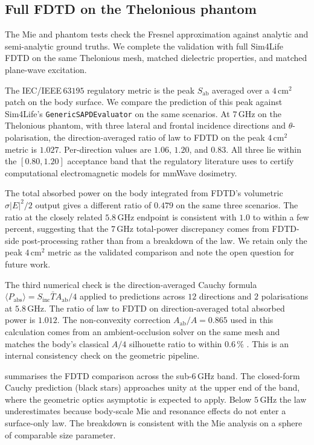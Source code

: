 \documentclass[journal,twocolumn,10pt]{IEEEtran}
\theoremstyle{plain}
\theoremstyle{remark}
\newcommand{\Sinc}{S_{\mathrm{inc}}}
\newcommand{\Sab}{S_{\mathrm{ab}}}
\newcommand{\Tbar}{\bar{T}}
\begin{document}
\subsection{Full FDTD on the Thelonious phantom}
The Mie and phantom tests check the Fresnel approximation against
analytic and semi-analytic ground truths. We complete the validation
with full Sim4Life FDTD on the same Thelonious mesh, matched
dielectric properties, and matched plane-wave excitation.

The IEC/IEEE\,$63195$ regulatory metric is the peak $\Sab$ averaged
over a $4\,\mathrm{cm}^2$ patch on the body surface. We compare the
prediction of this peak against Sim4Life's
\texttt{GenericSAPDEvaluator} on the same scenarios. At $7\,$GHz on
the Thelonious phantom, with three lateral and frontal incidence
directions and $\theta$-polarisation, the direction-averaged ratio
of law to FDTD on the peak $4\,\mathrm{cm}^2$ metric is
$1.027$. Per-direction values are $1.06$, $1.20$, and $0.83$. All
three lie within the $[0.80, 1.20]$ acceptance band that the
regulatory literature uses to certify computational electromagnetic
models for mmWave dosimetry.

The total absorbed power on the body integrated from FDTD's
volumetric $\sigma|E|^2/2$ output gives a different ratio of $0.479$
on the same three scenarios. The ratio at the closely related
$5.8\,$GHz endpoint is consistent with $1.0$ to within a few
percent, suggesting that the $7\,$GHz total-power discrepancy comes
from FDTD-side post-processing rather than from a breakdown of the
law. We retain only the peak $4\,\mathrm{cm}^2$
metric as the validated comparison and note the open question for
future work.

The third numerical check is the direction-averaged Cauchy formula
$\langle P_{\mathrm{abs}} \rangle = \Sinc \Tbar A_{\mathrm{ab}}/4$
applied to predictions across $12$ directions and $2$ polarisations
at $5.8\,$GHz. The ratio of law to FDTD on direction-averaged total
absorbed power is $1.012$. The
non-convexity correction $A_{\mathrm{ab}}/A = 0.865$ used in this
calculation comes from an ambient-occlusion solver on the same mesh
and matches the body's classical $A/4$ silhouette ratio to within
$0.6\,\%$ \cite{Cauchy1841}. This is an internal consistency check
on the geometric pipeline.

 summarises the FDTD comparison across the
sub-$6\,$GHz band. The closed-form Cauchy prediction (black stars)
approaches unity at the upper end of the band, where the geometric
optics asymptotic is expected to apply. Below $5\,$GHz the
law underestimates because body-scale Mie and resonance
effects do not enter a surface-only law. The breakdown is
consistent with the Mie analysis on a sphere of comparable size
parameter.
\end{document}
